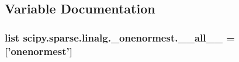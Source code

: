 \subsection{Variable Documentation}
\hypertarget{namespacescipy_1_1sparse_1_1linalg_1_1__onenormest_ac2c933e61f367215794e75c7956b3c32}{}
\subsubsection[{\+\_\+\+\_\+all\+\_\+\+\_\+}]{\setlength{\rightskip}{0pt plus 5cm}list scipy.\+sparse.\+linalg.\+\_\+onenormest.\+\_\+\+\_\+all\+\_\+\+\_\+ = \mbox{[}'{\bf onenormest}'\mbox{]}}\label{namespacescipy_1_1sparse_1_1linalg_1_1__onenormest_ac2c933e61f367215794e75c7956b3c32}
